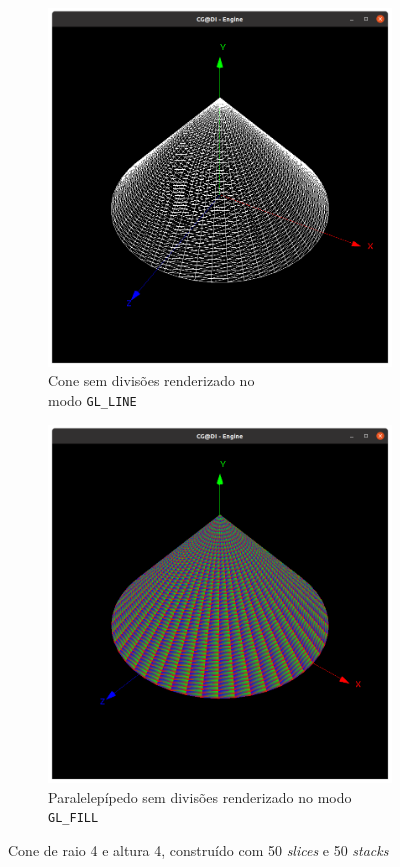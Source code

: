 \documentclass[a4paper, 11pt]{article}
\begin{document}
\begin{figure}[H]
\centering
\begin{subfigure}{.5\textwidth}
    \centering
    \includegraphics[width=\textwidth]{img/cone_linhas.png}
    \caption{Cone sem divisões renderizado no \\modo \texttt{GL\_LINE}}
\end{subfigure}%
\begin{subfigure}{.5\textwidth}
    \centering
    \includegraphics[width=\textwidth]{img/cone_preenchido.png}
    \caption{Paralelepípedo sem divisões renderizado no modo \texttt{GL\_FILL}}
\end{subfigure}
\caption{Cone de raio 4 e altura 4, construído com 50 \textit{slices} e 50 \textit{stacks}}
\end{figure}
\end{document}
